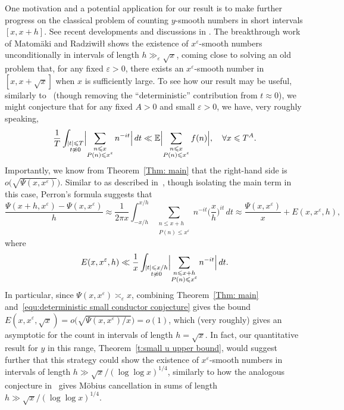 \documentclass[12pt,a4paper,reqno]{amsart}
\numberwithin{equation}{section}
\def\E{\mathbb E}
\def\ee{\varepsilon}
\def\leq {\leqslant}
\theoremstyle{remark}
\theoremstyle{definition}
\numberwithin{equation}{section}
\theoremstyle{remark}
\def\E{\mathbb E}
\begin{document}
One motivation and a potential application for our result is to make further progress on the classical problem of counting $y$-smooth numbers in short intervals $[x, x+h]$. See recent developments and discussions in \cite{soundshortinterval, KYounis}. The breakthrough work of Matomäki and Radziwi\l{}\l{} \cite{MR16} shows the existence of $x^{\ee}$-smooth numbers unconditionally in intervals of length $h\gg_{\ee} \sqrt{x}$, coming close to solving an old problem that, for any fixed $\ee > 0$, there exists an $x^{\ee}$-smooth number in $[x, x+ \sqrt{x}]$ when $x$ is sufficiently large. To see how our result may be useful, similarly to~\cite[Equation (1.2)]{harpertypical} (though removing the ``deterministic'' contribution from $t \approx 0$), we might conjecture that for any fixed $A > 0$ and small $\ee>0$, we have, very roughly speaking,
\begin{equation}\label{equ:deterministic small conductor conjecture}
\frac{1}{T} \int_{\substack{|t| \leq T \\ t \not \approx 0}} \Bigl| \sum_{\substack{n \leq x \\ P(n) \leq x^{\ee}}} n^{-it} \Bigr| \, dt \ll \E \Bigl| \sum_{\substack{n \leq x \\ P(n) \leq x^{\ee}}} f(n) \Bigr|, \quad \forall x \leq T^A .
\end{equation}
Importantly, we know from Theorem~\ref{Thm: main} that the right-hand side is $o \bigl(\sqrt{\Psi(x,x^{\ee})} \bigr)$. Similar to as described in~\cite{harpertypical}, though isolating the main term in this case, Perron's formula suggests that
\[
\frac{\Psi (x + h, x^{\ee}) - \Psi (x,x^{\ee})}{h} \approx \frac{1}{2\pi x} \int_{-x/h}^{x/h} \sum_{\substack{n \leq x + h \\ P(n) \leq x^{\ee}}} n^{-it} \biggl( \frac{x}{h} \biggr)^{it} \, dt \approx \frac{\Psi(x,x^{\ee})}{x} + E(x,x^{\ee},h),
\]
where
\[
E (x,x^{\ee},h) \ll \frac{1}{x} \int_{\substack{|t| \leq x/h \\ t \not \approx 0}} \Bigl| \sum_{\substack{n \leq x + h \\ P(n) \leq x^{\ee}}} n^{-it} \Bigr| \, dt .
\]
In particular, since $\Psi(x,x^\varepsilon) \asymp_\varepsilon x$, combining Theorem~\ref{Thm: main} and~\eqref{equ:deterministic small conductor conjecture} gives the bound $E (x,x^{\varepsilon},\sqrt{x}) = o\big(  \sqrt{\Psi(x, x^{\ee})/x} \big) = o (1)$, which (very roughly) gives an asymptotic for the count in intervals of length $h = \sqrt{x}$. In fact, our quantitative result for $y$ in this range, Theorem~\ref{t:small u upper bound}, would suggest further that this strategy could show the existence of $x^{\ee}$-smooth numbers in intervals of length $h \gg \sqrt{x} / (\log \log x)^{1/4}$, similarly to how the analogous conjecture in~\cite{harpertypical} gives M\"{o}bius cancellation in sums of length $h \gg \sqrt{x} / (\log \log x)^{1/4}$.
\end{document}
